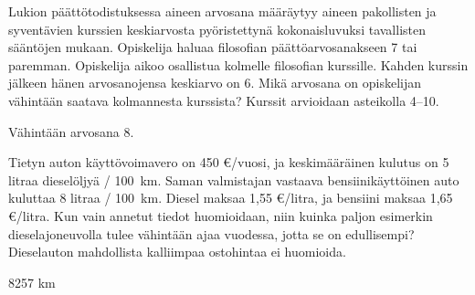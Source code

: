\begin{tehtava}
Lukion päättötodistuksessa aineen arvosana määräytyy aineen pakollisten ja syventävien kurssien keskiarvosta pyöristettynä kokonaisluvuksi tavallisten 
sääntöjen mukaan. Opiskelija haluaa filosofian päättöarvosanakseen 7 tai paremman. Opiskelija aikoo osallistua kolmelle filosofian kurssille. Kahden 
kurssin jälkeen hänen arvosanojensa keskiarvo on 6. Mikä arvosana on opiskelijan vähintään saatava kolmannesta kurssista? Kurssit arvioidaan asteikolla 
4--10.
\begin{vastaus}
Vähintään arvosana 8.
\end{vastaus}
\end{tehtava}

\begin{tehtava}
	Tietyn auton käyttövoimavero on 450 \euro /vuosi, ja keskimääräinen kulutus on 5 litraa dieselöljyä / 100~km. Saman valmistajan vastaava bensiinikäyttöinen auto kuluttaa 8 litraa / 100~km. Diesel maksaa 1,55 \euro /litra, ja bensiini maksaa 1,65 \euro /litra. Kun vain annetut tiedot huomioidaan, niin kuinka paljon esimerkin dieselajoneuvolla tulee vähintään ajaa vuodessa, jotta se on edullisempi? Dieselauton mahdollista kalliimpaa ostohintaa ei huomioida.
    \begin{vastaus}
        8257 km
    \end{vastaus}
\end{tehtava}
